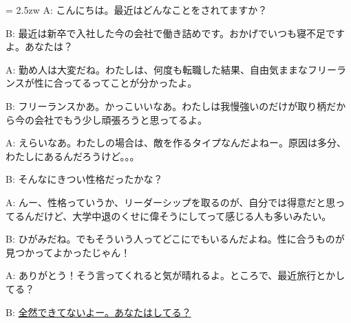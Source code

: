 \documentclass[11pt]{amsart}
\title{}
\author{}
\newenvironment{hangall}[1]{\hangindent = 2.5zw\everypar{\hangindent = 2.5zw}}{}
\begin{document}
\maketitle
\begin{hangall}{}%
A: こんにちは。最近はどんなことをされてますか？

B: 最近は新卒で入社した今の会社で働き詰めです。おかげでいつも寝不足ですよ。あなたは？

A: 勤め人は大変だね。わたしは、何度も転職した結果、自由気ままなフリーランスが性に合ってるってことが分かったよ。

B: フリーランスかあ。かっこいいなあ。わたしは我慢強いのだけが取り柄だから今の会社でもう少し頑張ろうと思ってるよ。

A: えらいなあ。わたしの場合は、敵を作るタイプなんだよねー。原因は多分、わたしにあるんだろうけど。。。

B: そんなにきつい性格だったかな？

A: んー、性格っていうか、リーダーシップを取るのが、自分では得意だと思ってるんだけど、大学中退のくせに偉そうにしてって感じる人も多いみたい。

B: ひがみだね。でもそういう人ってどこにでもいるんだよね。性に合うものが見つかってよかったじゃん！

A: ありがとう！そう言ってくれると気が晴れるよ。ところで、最近旅行とかしてる？

B: \ul{全然できてないよー。あなたはしてる？}\end{hangall}
\end{document}
